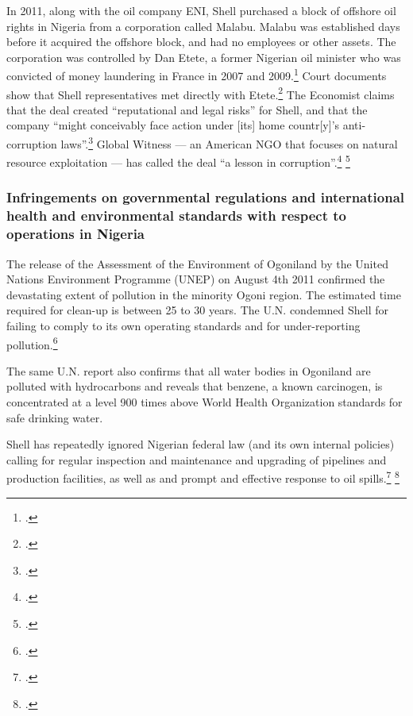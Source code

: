 In 2011, along with the oil company ENI, Shell purchased a block of offshore oil rights in Nigeria from a corporation called Malabu.
Malabu was established days before it acquired the offshore block, and had no employees or other assets. 
The corporation was controlled by Dan Etete, a former Nigerian oil minister who was convicted of money laundering in France in 2007 and 2009.\footcite[][]{SafeSexNigeria}
Court documents show that Shell representatives met directly with Etete.\footcite[][]{GWShellKnew}
The Economist claims that the deal created ``reputational and legal risks'' for Shell, and that the company ``might conceivably face action under [its] home countr[y]'s anti-corruption laws''.\footcite[][]{SafeSexNigeria}
Global Witness --- an American NGO that focuses on natural resource exploitation --- has called the deal ``a lesson in corruption''.\footcite[See: ][]{GWObscurePayments} \footcite[][]{GWComeClean}




	\subsubsection{Infringements on governmental regulations and international health and environmental standards with respect to operations in Nigeria}
	
	
	
The release of the Assessment of the Environment of Ogoniland by the United Nations Environment Programme (UNEP) on August 4th 2011 confirmed the devastating extent of pollution in the minority Ogoni region. 
The estimated time required for clean-up is between 25 to 30 years. 
The U.N. condemned Shell for failing to comply to its own operating standards and for under-reporting pollution.\footcite[][]{Ogoniland}



The same U.N. report also confirms that all water bodies in Ogoniland are polluted with hydrocarbons and reveals that benzene, a known carcinogen, is concentrated at a level 900 times above World Health Organization standards for safe drinking water.



Shell has repeatedly ignored Nigerian federal law (and its own internal policies) calling for regular inspection and maintenance and upgrading of pipelines and production facilities, as well as and prompt and effective response to oil spills.\footcite[][]{Steiner_2008}  \footcite[][]{Steiner_2010}



